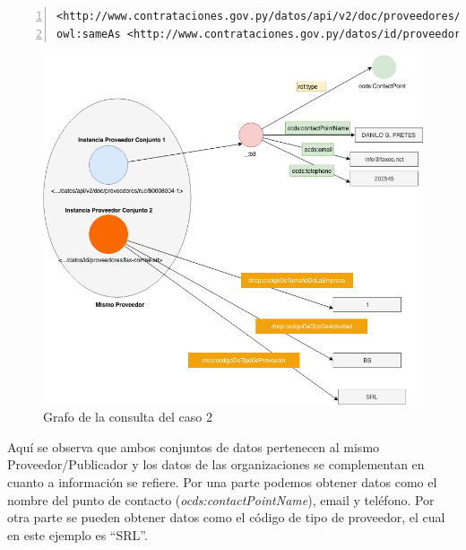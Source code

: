 \noindent\begin{minipage}[c]{\textwidth}
    \begin{lstlisting}[captionpos=b, caption=Declaracion de igualdad semantica de dos instancias, label=lst:caso2-1,  numbers=left,  numberstyle=\tiny\color{mygray},
        basicstyle=\footnotesize\ttfamily,frame=single]
<http://www.contrataciones.gov.py/datos/api/v2/doc/proveedores/ruc/80008004-1> 
owl:sameAs <http://www.contrataciones.gov.py/datos/id/proveedores/fax-comtel-srl>  .

     \end{lstlisting}
\end{minipage}
     \begin{figure}[ht!]
        \centering
        \includegraphics[width=150mm]{figuras/Diagramas-Caso2.png}
        \caption{Grafo de la consulta del caso 2}
        \label{img:DiagramaCaso2}
     \end{figure}

     Aquí se observa que ambos conjuntos de datos pertenecen al mismo Proveedor/Publicador y los datos de las organizaciones se complementan en cuanto a información se refiere. Por una parte podemos obtener datos como el nombre del punto de contacto (\textit{ocds:contactPointName}), email y teléfono. Por otra parte se pueden obtener datos como el código de tipo de proveedor, el cual en este ejemplo es “SRL”. 

    